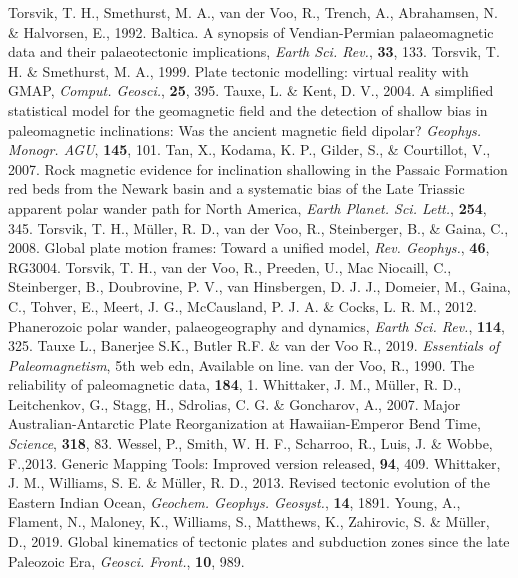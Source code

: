 \begin{thebibliography}{}
  Torsvik, T. H., Smethurst, M. A., van der Voo, R., Trench, A., Abrahamsen, N.
  \& Halvorsen, E., 1992. Baltica. A synopsis of Vendian-Permian palaeomagnetic
  data and their palaeotectonic implications, \textit{Earth Sci. Rev.},
  \textbf{33}, 133.
  Torsvik, T. H. \& Smethurst, M. A., 1999. Plate tectonic modelling: virtual
  reality with GMAP, \textit{Comput. Geosci.}, \textbf{25}, 395.
  Tauxe, L. \& Kent, D. V., 2004. A simplified statistical model for the
  geomagnetic field and the detection of shallow bias in paleomagnetic
  inclinations: Was the ancient magnetic field dipolar? \textit{Geophys.
  Monogr. AGU}, \textbf{145}, 101.
  Tan, X., Kodama, K. P., Gilder, S., \& Courtillot, V., 2007. Rock magnetic
  evidence for inclination shallowing in the Passaic Formation red beds from
  the Newark basin and a systematic bias of the Late Triassic apparent polar
  wander path for North America, \textit{Earth Planet. Sci. Lett.},
  \textbf{254}, 345.
  Torsvik, T. H., M{\"{u}}ller, R. D., van der Voo, R., Steinberger, B., \&
  Gaina, C., 2008. Global plate motion frames: Toward a unified model,
  \textit{Rev. Geophys.}, \textbf{46}, RG3004.
  Torsvik, T. H., van der Voo, R., Preeden, U., Mac Niocaill, C., Steinberger,
  B., Doubrovine, P. V., van Hinsbergen, D. J. J., Domeier, M., Gaina, C.,
  Tohver, E., Meert, J. G., McCausland, P. J. A. \& Cocks, L. R. M., 2012.
  Phanerozoic polar wander, palaeogeography and dynamics, \textit{Earth Sci.
  Rev.}, \textbf{114}, 325.
  Tauxe L., Banerjee S.K., Butler R.F. \& van der Voo R., 2019.
  \textit{Essentials of Paleomagnetism}, 5th web edn, Available on line.
  van der Voo, R., 1990. The reliability of paleomagnetic data,
  \tecto{}\textbf{184}, 1.
  Whittaker, J. M., M{\"{u}}ller, R. D., Leitchenkov, G., Stagg, H., Sdrolias,
  C. G. \& Goncharov, A., 2007. Major Australian-Antarctic Plate Reorganization
  at Hawaiian-Emperor Bend Time, \textit{Science}, \textbf{318},
  83.
  Wessel, P., Smith, W. H. F., Scharroo, R., Luis, J. \& Wobbe, F.,2013. Generic
  Mapping Tools: Improved version released, \eos{}\textbf{94}, 409.
  Whittaker, J. M., Williams, S. E. \& M{\"{u}}ller, R. D., 2013. Revised
  tectonic evolution of the Eastern Indian Ocean, \textit{Geochem. Geophys.
  Geosyst.}, \textbf{14}, 1891.
  Young, A., Flament, N., Maloney, K., Williams, S., Matthews, K., Zahirovic, S.
  \& M{\"{u}}ller, D., 2019. Global kinematics of tectonic plates and subduction
  zones since the late Paleozoic Era, \textit{Geosci. Front.},
  \textbf{10}, 989.
\end{thebibliography}

